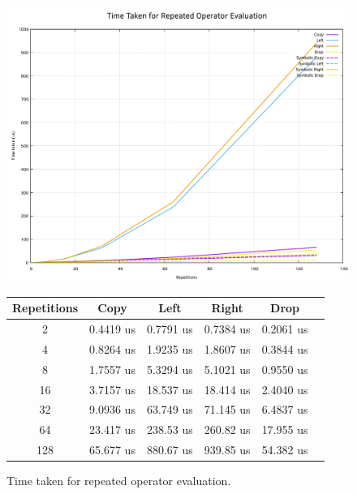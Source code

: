\begin{figure}[H]
    \centering
    \includegraphics[width=\textwidth]{04_results/images/repeated_operator_results}

    \begin{center}
    \begin{tabular}{ |c|c|c|c|c|c| } 
    \hline
    Repetitions	& Copy & Left & Right & Drop \\
    \hline
    2 & 0.4419 us & 0.7791 us & 0.7384 us & 0.2061 us \\
    \hline
    4 & 0.8264 us & 1.9235 us & 1.8607 us & 0.3844 us \\
    \hline
    8 & 1.7557 us & 5.3294 us & 5.1021 us & 0.9550 us \\
    \hline
    16 & 3.7157 us & 18.537 us & 18.414 us & 2.4040 us \\
    \hline
    32 & 9.0936 us & 63.749 us & 71.145 us & 6.4837 us \\
    \hline
    64 & 23.417 us & 238.53 us & 260.82 us & 17.955 us \\
    \hline
    128 & 65.677 us & 880.67 us & 939.85 us & 54.382 us \\
    \hline
    \end{tabular}
    \end{center}
    \caption{Time taken for repeated operator evaluation.}


\end{figure}
